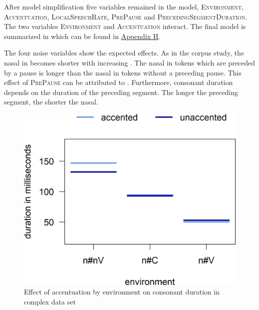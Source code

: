 After model simplification five variables remained in the model, \textsc{Environment}, \textsc{Accentuation}, \textsc{LocalSpeechRate}, \textsc{PrePause} and \textsc{PrecedingSegmentDuration}. The two variables \textsc{Environment} and \textsc{Accentuation} interact. The final model is summarized in  which can be found in \hyperref[Appendix H: Model Summaries Experiment]{Appendix H}.


The four noise variables show the expected effects. As in the corpus study, the nasal in  becomes shorter with increasing . 
The nasal in tokens which are preceded by a pause is longer than the nasal in tokens without a preceding pause. This effect of \textsc{PrePause}  can be attributed to .  
Furthermore, consonant duration depends on the duration of the preceding segment. The longer the preceding segment, the shorter the nasal. 

\begin{figure}
	
	\includegraphics [scale=0.5] {images/Experiment/unModelInterCatAcc}
	\caption{Effect of accentuation by environment on consonant duration in complex data set}
	\label{fig:NumNasal unComplex experiment}
\end{figure}


